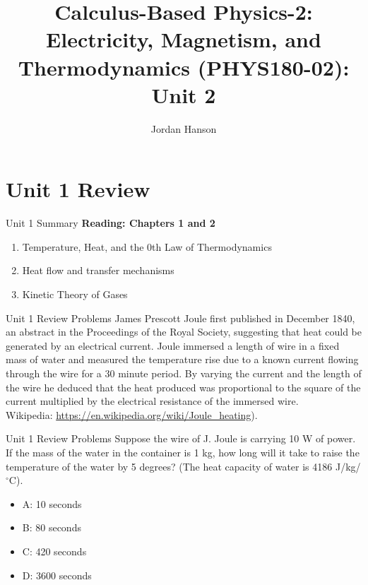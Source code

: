 \documentclass{beamer}
\title{Calculus-Based Physics-2: Electricity, Magnetism, and Thermodynamics (PHYS180-02): Unit 2}
\author{Jordan Hanson}
\institute{Whittier College Department of Physics and Astronomy}
\begin{document}
\maketitle

\section{Unit 1 Review}

\begin{frame}{Unit 1 Summary}
\textbf{Reading: Chapters 1 and 2}
\begin{enumerate}
\item Temperature, Heat, and the 0th Law of Thermodynamics
\item Heat flow and transfer mechanisms
\item Kinetic Theory of Gases
\end{enumerate}
\end{frame}

\begin{frame}{Unit 1 Review Problems}
\small
James Prescott Joule first published in December 1840, an abstract in the Proceedings of the Royal Society, suggesting that heat could be generated by an electrical current. Joule immersed a length of wire in a fixed mass of water and measured the temperature rise due to a known current flowing through the wire for a 30 minute period. By varying the current and the length of the wire he deduced that the heat produced was proportional to the square of the current multiplied by the electrical resistance of the immersed wire. \\ \vspace{0.5cm} Wikipedia: \url{https://en.wikipedia.org/wiki/Joule_heating}).
\end{frame}

\begin{frame}{Unit 1 Review Problems}
Suppose the wire of J. Joule is carrying 10 W of power.  If the mass of the water in the container is 1 kg, how long will it take to raise the temperature of the water by 5 degrees?  (The heat capacity of water is 4186 J/kg/$^{\circ}$C).
\begin{itemize}
\item A: 10 seconds
\item B: 80 seconds
\item C: 420 seconds
\item D: 3600 seconds
\end{itemize}
\end{frame}
\end{document}
